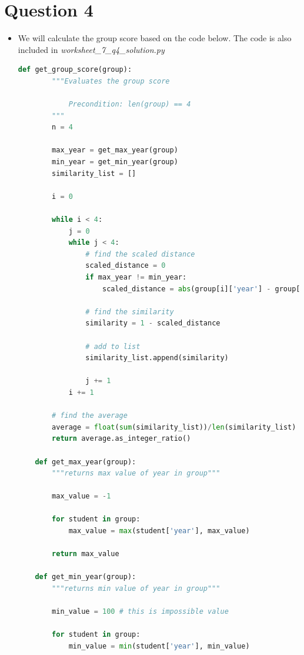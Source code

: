 \documentclass[12pt]{article}
\begin{document}
\section*{Question 4}
\begin{itemize}
    \item

    We will calculate the group score based on the code below. The code
    is also included in \textit{worksheet\_7\_q4\_solution.py}

    \bigskip

    \begin{lstlisting}[language=Python]
    def get_group_score(group):
        """Evaluates the group score

            Precondition: len(group) == 4
        """
        n = 4

        max_year = get_max_year(group)
        min_year = get_min_year(group)
        similarity_list = []

        i = 0

        while i < 4:
            j = 0
            while j < 4:
                # find the scaled distance
                scaled_distance = 0
                if max_year != min_year:
                    scaled_distance = abs(group[i]['year'] - group[j]['year']) / float(max_year - min_year)

                # find the similarity
                similarity = 1 - scaled_distance

                # add to list
                similarity_list.append(similarity)

                j += 1
            i += 1

        # find the average
        average = float(sum(similarity_list))/len(similarity_list)
        return average.as_integer_ratio()

    def get_max_year(group):
        """returns max value of year in group"""

        max_value = -1

        for student in group:
            max_value = max(student['year'], max_value)

        return max_value

    def get_min_year(group):
        """returns min value of year in group"""

        min_value = 100 # this is impossible value

        for student in group:
            min_value = min(student['year'], min_value)


\end{lstlisting}
\end{itemize}
\end{document}
